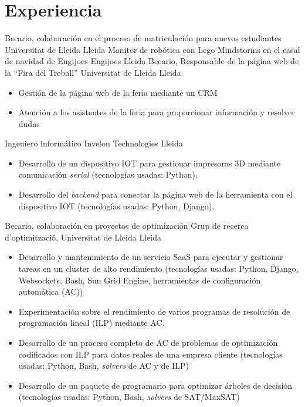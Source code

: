 \documentclass{cv}
\begin{document}
\section{Experiencia}
	{Becario, colaboración en el proceso de matriculación para nuevos estudiantes}
	{Universitat de Lleida}
	{Lleida}
	{}
	{}
	{Monitor de robótica con Lego Mindstorms en el casal de navidad de Engijocs}
	{Engijocs}
	{Lleida}
	{}
	{}
	{Becario, Responsable de la página web de la ``Fira del Treball''}
	{Universitat de Lleida}
	{Lleida}
	{}
	{\begin{itemize}
		\item Gestión de la página web de la feria mediante un CRM
		\item Atención a los asistentes de la feria para proporcionar información y resolver dudas
	\end{itemize}}
	{Ingeniero informático}
	{Invelon Technologies}
	{Lleida}
	{}
	{\begin{itemize}
		\item Desarrollo de un dispositivo IOT para gestionar impresoras 3D mediante
			comunicación \textit{serial} (tecnologías usadas: Python).
		\item Desarrollo del \textit{backend} para conectar la página web de la herramienta
			con el dispositivo IOT (tecnologías usadas: Python, Django).
	\end{itemize}}
	{Becario, colaboración en proyectos de optimización}
	{Grup de recerca d'optimització, Universitat de Lleida}
	{Lleida}
	{}
	{\begin{itemize}
		\item Desarrollo y mantenimiento de un servicio SaaS para ejecutar
			y gestionar tareas en un cluster de alto rendimiento (tecnologías
			usadas: Python, Django, Websockets, Bash, Sun Grid Engine,
			herramientas de configuración automática (AC))
		\item Experimentación sobre el rendimiento de varios programas de
			resolución de programación lineal (ILP) mediante AC.
		\item Desarrollo de un proceso completo de AC de problemas de optimización
			codificados con ILP para datos reales de una empresa cliente
			(tecnologías usadas: Python, Bash, \textit{solvers} de AC y de ILP)
		\item Desarrollo de un paquete de programario para optimizar árboles de
			decisión (tecnologías usadas: Python, Bash, \textit{solvers} de SAT/MaxSAT)
	\end{itemize}}
\end{document}
